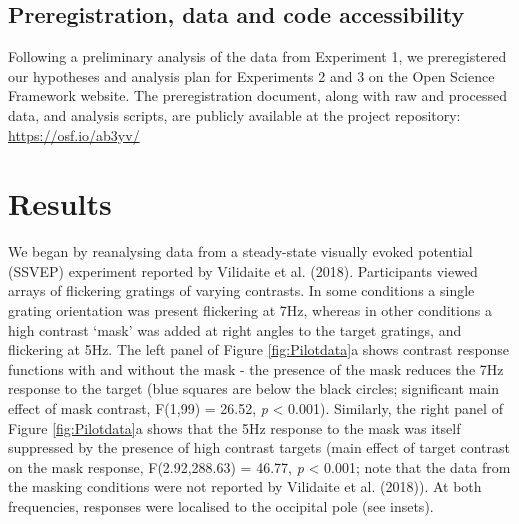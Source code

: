\documentclass[
]{article}
\begin{document}
\hypertarget{preregistration-data-and-code-accessibility}{%
\subsection{Preregistration, data and code accessibility}\label{preregistration-data-and-code-accessibility}}

Following a preliminary analysis of the data from Experiment 1, we preregistered our hypotheses and analysis plan for Experiments 2 and 3 on the Open Science Framework website. The preregistration document, along with raw and processed data, and analysis scripts, are publicly available at the project repository: \url{https://osf.io/ab3yv/}

\hypertarget{results}{%
\section{Results}\label{results}}

We began by reanalysing data from a steady-state visually evoked potential (SSVEP) experiment reported by Vilidaite et al. (2018). Participants viewed arrays of flickering gratings of varying contrasts. In some conditions a single grating orientation was present flickering at 7Hz, whereas in other conditions a high contrast `mask' was added at right angles to the target gratings, and flickering at 5Hz. The left panel of Figure \ref{fig:Pilotdata}a shows contrast response functions with and without the mask - the presence of the mask reduces the 7Hz response to the target (blue squares are below the black circles; significant main effect of mask contrast, F(1,99) = 26.52, \emph{p} \textless{} 0.001). Similarly, the right panel of Figure \ref{fig:Pilotdata}a shows that the 5Hz response to the mask was itself suppressed by the presence of high contrast targets (main effect of target contrast on the mask response, F(2.92,288.63) = 46.77, \emph{p} \textless{} 0.001; note that the data from the masking conditions were not reported by Vilidaite et al. (2018)). At both frequencies, responses were localised to the occipital pole (see insets).
\end{document}
